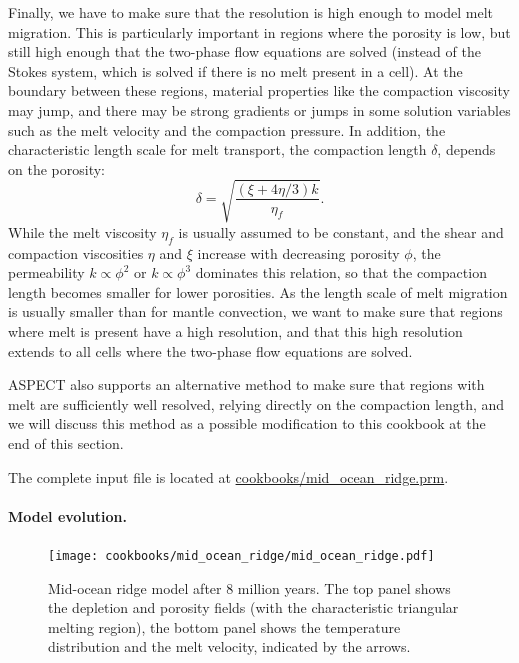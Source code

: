 \documentclass{article}
\newcommand{\aspect}{\textsc{ASPECT}}
\begin{document}
Finally, we have to make sure that the resolution is high enough to model melt migration. 
This is particularly important in regions where the porosity is low, but still high enough that 
the two-phase flow equations are solved (instead of the Stokes system, which is solved if there is  
no melt present in a cell). At the boundary between these regions, material properties like the 
compaction viscosity may jump, and there may be strong gradients or jumps in some solution variables such 
as the melt velocity and the compaction pressure. In addition, the characteristic length scale for melt transport, 
the compaction length $\delta$, depends on the porosity:
\begin{equation}
\delta = \sqrt{\frac{(\xi+4\eta/3)k}{\eta_f}}.
\end{equation}
While the melt viscosity $\eta_f$ is usually assumed to be constant, and the shear and compaction 
viscosities $\eta$ and  $\xi$ increase with decreasing porosity $\phi$, the permeability 
$k \propto \phi^2$ or $k \propto \phi^3$ dominates this relation, so that the compaction length becomes 
smaller for lower porosities. 
As the length scale of melt migration is usually smaller than for mantle convection, we want to make 
sure that regions where melt is present have a high resolution, and that this high resolution extends 
to all cells where the two-phase flow equations are solved. 



\aspect{} also supports an alternative method to make sure that regions with melt are sufficiently 
well resolved, relying directly on the compaction length, and we will discuss this method as a possible 
modification to this cookbook at the end of this section. 

The complete input file is located at \url{cookbooks/mid_ocean_ridge.prm}. 

\paragraph{Model evolution.}

\begin{figure}
    \centering
    \texttt{[image: cookbooks/mid\_ocean\_ridge/mid\_ocean\_ridge.pdf]}
    \caption{Mid-ocean ridge model after 8 million years. The top panel shows the depletion 
             and porosity fields (with the characteristic triangular melting region), 
             the bottom panel shows the temperature distribution and the melt velocity, indicated 
             by the arrows.}
    \label{fig:mid-ocean-ridge}
\end{figure}
\end{document}
